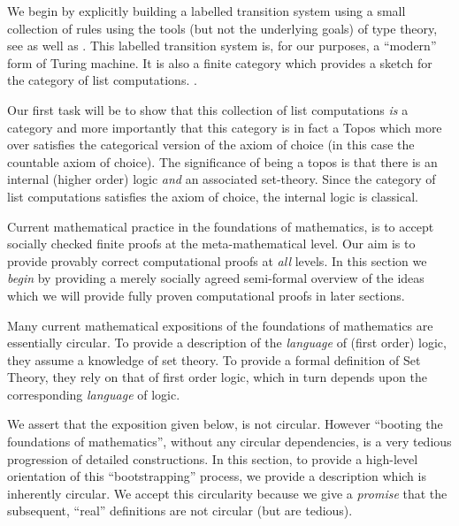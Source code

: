 We begin by explicitly building a labelled transition system using a small
collection of rules using the tools (but not the underlying goals) of type
theory, see \cite[Appendix A.2]{awodeyCoquandVoevodsky2013homotopyTypeTheory} as
well as \cite{jacobs1999categoricalLogicTypeTheory}. This labelled transition
system is, for our purposes, a ``modern'' form of Turing machine. It is also a
finite category which provides a sketch for the category of list computations.
.

Our first task will be to show that this collection of list computations
\emph{is} a category and more importantly that this category is in fact a Topos
which more over satisfies the categorical version of the axiom of choice (in
this case the countable axiom of choice). The significance of being a topos is
that there is an internal (higher order) logic \emph{and} an associated
set-theory. Since the category of list computations satisfies the axiom of
choice, the internal logic is classical.


Current mathematical practice in the foundations of mathematics, is to accept
socially checked finite proofs at the meta-mathematical level. Our aim is to
provide provably correct computational proofs at \emph{all} levels. In this
section we \emph{begin} by providing a merely socially agreed semi-formal
overview of the ideas which we will provide fully proven computational proofs in
later sections.

Many current mathematical expositions of the foundations of mathematics are
essentially circular. To provide a description of the \emph{language} of (first
order) logic, they assume a knowledge of set theory. To provide a formal
definition of Set Theory, they rely on that of first order logic, which in turn
depends upon the corresponding \emph{language} of logic.

We assert that the exposition given below, is not circular. However ``booting
the foundations of mathematics''\footnotemark, without any circular
dependencies, is a very tedious progression of detailed constructions. In this
section, to provide a high-level orientation of this ``bootstrapping'' process,
we provide a description which is inherently circular. We accept this
circularity because we give a \emph{promise} that the subsequent, ``real''
definitions are not circular (but are tedious).

